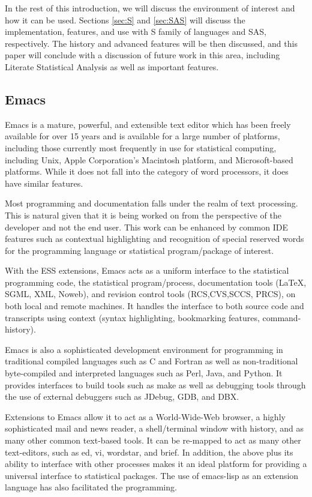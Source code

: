\documentclass{article}
\begin{document}
In the rest of this introduction, we will discuss the environment of
interest and how it can be used.  Sections \ref{sec:S} and
\ref{sec:SAS} will discuss the implementation, features, and use with
S family of languages and SAS, respectively.  The history and advanced
features will be then discussed, and this paper will conclude with a
discussion of future work in this area, including Literate Statistical
Analysis as well as important features.

\subsection{Emacs}
\label{sec:intro:emacs}

Emacs is a mature, powerful, and extensible text editor which has been
freely available for over 15 years and is available for a large number
of platforms, including those currently most frequently in use for
statistical computing, including Unix, Apple Corporation's Macintosh
platform, and Microsoft-based platforms.  While it does not fall into
the category of word processors, it does have similar features.

Most programming and documentation falls under the realm of text
processing.  This is natural given that it is being worked on from the
perspective of the developer and not the end user.  This work can be
enhanced by common IDE features such as contextual highlighting and
recognition of special reserved words for the programming language or
statistical program/package of interest.

With the ESS extensions, Emacs acts as a uniform interface to the
statistical programming code, the statistical program/process,
documentation tools (\LaTeX, SGML, XML, Noweb), and revision control
tools (RCS,CVS,SCCS, PRCS), on both local and remote machines.  It
handles the interface to both source code and transcripts using
context (syntax highlighting, bookmarking features, command-history).

Emacs is also a sophisticated development environment for programming
in traditional compiled languages such as C and Fortran as well as
non-traditional byte-compiled and interpreted languages such as Perl,
Java, and Python.  It provides interfaces to build tools such as make
as well as debugging tools through the use of external debuggers such
as JDebug, GDB, and DBX.

Extensions to Emacs allow it to act as a World-Wide-Web browser, a
highly sophisticated mail and news reader, a shell/terminal window
with history, and as many other common text-based tools.  It can be
re-mapped to act as many other text-editors, such as ed, vi, wordstar,
and brief.  In addition, the above plus its ability to interface with
other processes makes it an ideal platform for providing a universal
interface to statistical packages.  The use of emacs-lisp as an
extension language has also facilitated the programming.
\end{document}
